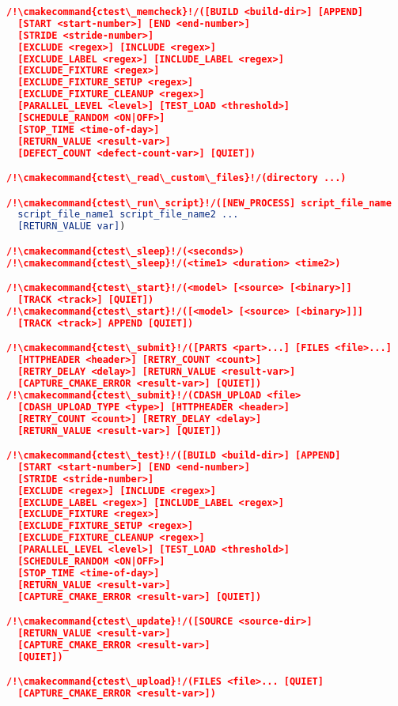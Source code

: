 \documentclass{article}
\newcommand{\cmakecommand}[1]{{\href{https://cmake.org/cmake/help/v3.20/command/#1.html}{#1}}}
\begin{document}
\begin{minipage}[t]{0.18\linewidth}
\begin{lstlisting}[language=CMake]
/!\cmakecommand{ctest\_memcheck}!/([BUILD <build-dir>] [APPEND]
  [START <start-number>] [END <end-number>]
  [STRIDE <stride-number>]
  [EXCLUDE <regex>] [INCLUDE <regex>]
  [EXCLUDE_LABEL <regex>] [INCLUDE_LABEL <regex>]
  [EXCLUDE_FIXTURE <regex>]
  [EXCLUDE_FIXTURE_SETUP <regex>]
  [EXCLUDE_FIXTURE_CLEANUP <regex>]
  [PARALLEL_LEVEL <level>] [TEST_LOAD <threshold>]
  [SCHEDULE_RANDOM <ON|OFF>]
  [STOP_TIME <time-of-day>]
  [RETURN_VALUE <result-var>]
  [DEFECT_COUNT <defect-count-var>] [QUIET])

/!\cmakecommand{ctest\_read\_custom\_files}!/(directory ...)

/!\cmakecommand{ctest\_run\_script}!/([NEW_PROCESS] script_file_name
  script_file_name1 script_file_name2 ...
  [RETURN_VALUE var])

/!\cmakecommand{ctest\_sleep}!/(<seconds>)
/!\cmakecommand{ctest\_sleep}!/(<time1> <duration> <time2>)

/!\cmakecommand{ctest\_start}!/(<model> [<source> [<binary>]]
  [TRACK <track>] [QUIET])
/!\cmakecommand{ctest\_start}!/([<model> [<source> [<binary>]]]
  [TRACK <track>] APPEND [QUIET])

/!\cmakecommand{ctest\_submit}!/([PARTS <part>...] [FILES <file>...]
  [HTTPHEADER <header>] [RETRY_COUNT <count>]
  [RETRY_DELAY <delay>] [RETURN_VALUE <result-var>]
  [CAPTURE_CMAKE_ERROR <result-var>] [QUIET])
/!\cmakecommand{ctest\_submit}!/(CDASH_UPLOAD <file>
  [CDASH_UPLOAD_TYPE <type>] [HTTPHEADER <header>]
  [RETRY_COUNT <count>] [RETRY_DELAY <delay>]
  [RETURN_VALUE <result-var>] [QUIET])

/!\cmakecommand{ctest\_test}!/([BUILD <build-dir>] [APPEND]
  [START <start-number>] [END <end-number>]
  [STRIDE <stride-number>]
  [EXCLUDE <regex>] [INCLUDE <regex>]
  [EXCLUDE_LABEL <regex>] [INCLUDE_LABEL <regex>]
  [EXCLUDE_FIXTURE <regex>]
  [EXCLUDE_FIXTURE_SETUP <regex>]
  [EXCLUDE_FIXTURE_CLEANUP <regex>]
  [PARALLEL_LEVEL <level>] [TEST_LOAD <threshold>]
  [SCHEDULE_RANDOM <ON|OFF>]
  [STOP_TIME <time-of-day>]
  [RETURN_VALUE <result-var>]
  [CAPTURE_CMAKE_ERROR <result-var>] [QUIET])

/!\cmakecommand{ctest\_update}!/([SOURCE <source-dir>]
  [RETURN_VALUE <result-var>]
  [CAPTURE_CMAKE_ERROR <result-var>]
  [QUIET])

/!\cmakecommand{ctest\_upload}!/(FILES <file>... [QUIET]
  [CAPTURE_CMAKE_ERROR <result-var>])
\end{lstlisting}


\end{minipage}
\end{document}
